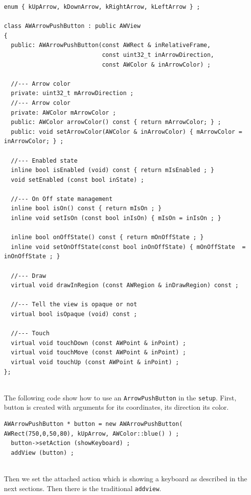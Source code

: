 \documentclass[a4paper,11pt]{extarticle}
\begin{document}
\begin{lstlisting}[language=Arduinonl]
enum { kUpArrow, kDownArrow, kRightArrow, kLeftArrow } ;

class AWArrowPushButton : public AWView
{
  public: AWArrowPushButton(const AWRect & inRelativeFrame,
                            const uint32_t inArrowDirection,
                            const AWColor & inArrowColor) ;

  //--- Arrow color
  private: uint32_t mArrowDirection ;
  //--- Arrow color
  private: AWColor mArrowColor ;
  public: AWColor arrowColor() const { return mArrowColor; } ;
  public: void setArrowColor(AWColor & inArrowColor) { mArrowColor = inArrowColor; } ;

  //--- Enabled state
  inline bool isEnabled (void) const { return mIsEnabled ; }
  void setEnabled (const bool inState) ;

  //--- On Off state management
  inline bool isOn() const { return mIsOn ; }
  inline void setIsOn (const bool inIsOn) { mIsOn = inIsOn ; }

  inline bool onOffState() const { return mOnOffState ; }
  inline void setOnOffState(const bool inOnOffState) { mOnOffState  = inOnOffState ; }

  //--- Draw
  virtual void drawInRegion (const AWRegion & inDrawRegion) const ;

  //--- Tell the view is opaque or not
  virtual bool isOpaque (void) const ;

  //--- Touch
  virtual void touchDown (const AWPoint & inPoint) ;
  virtual void touchMove (const AWPoint & inPoint) ;
  virtual void touchUp (const AWPoint & inPoint) ;
};
\end{lstlisting}

~\\ The following code show how to use an \texttt{ArrowPushButton} in the \texttt{setup}. First, button is created with arguments for its coordinates, its direction its color.

\begin{lstlisting}[language=Arduinonl]
AWArrowPushButton * button = new AWArrowPushButton( AWRect(750,0,50,80), kUpArrow, AWColor::blue() ) ;
  button->setAction (showKeyboard) ;
  addView (button) ;
\end{lstlisting}

~\\ Then we set the attached action which is showing a keyboard as described in the next sections. Then there is the traditional \texttt{addview}.
\end{document}

